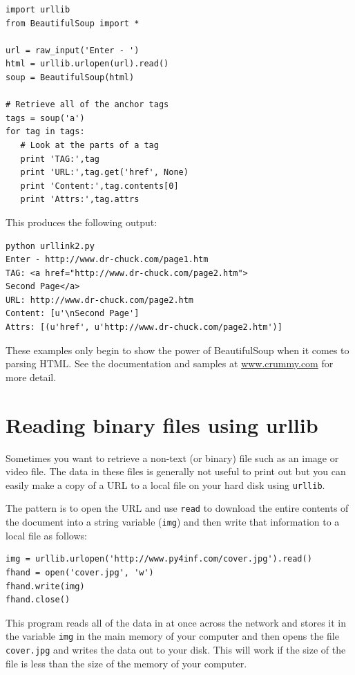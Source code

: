 \documentclass[11pt]{book}
\begin{document}
\beforeverb
\begin{verbatim}
import urllib
from BeautifulSoup import *

url = raw_input('Enter - ')
html = urllib.urlopen(url).read()
soup = BeautifulSoup(html)

# Retrieve all of the anchor tags
tags = soup('a')
for tag in tags:
   # Look at the parts of a tag
   print 'TAG:',tag
   print 'URL:',tag.get('href', None)
   print 'Content:',tag.contents[0]
   print 'Attrs:',tag.attrs
\end{verbatim}
\afterverb
%
This produces the following output:

\beforeverb
\begin{verbatim}
python urllink2.py 
Enter - http://www.dr-chuck.com/page1.htm
TAG: <a href="http://www.dr-chuck.com/page2.htm">
Second Page</a>
URL: http://www.dr-chuck.com/page2.htm
Content: [u'\nSecond Page']
Attrs: [(u'href', u'http://www.dr-chuck.com/page2.htm')]
\end{verbatim}
\afterverb
%
These examples only begin to show the power of BeautifulSoup
when it comes to parsing HTML.  See the documentation 
and samples at
\url{www.crummy.com}
for more detail.

\section{Reading binary files using urllib}

Sometimes you want to retrieve a non-text (or binary) file such as
an image or video file. The data in these files is generally not 
useful to print out but you can easily make a copy of a URL to a local
file on your hard disk using {\tt urllib}.

The pattern is to open the URL and use {\tt read} to download the entire
contents of the document into a string variable ({\tt img}) and then write that
information to a local file as follows:

\beforeverb
\begin{verbatim}
img = urllib.urlopen('http://www.py4inf.com/cover.jpg').read()
fhand = open('cover.jpg', 'w')
fhand.write(img)
fhand.close()
\end{verbatim}
\afterverb
%
This program reads all of the data in at once across the network and 
stores it in the variable {\tt img} in the main memory of your computer
and then opens the file {\tt cover.jpg} and writes the data out to your 
disk.  This will work if the size of the file is less than the size
of the memory of your computer.
\end{document}
